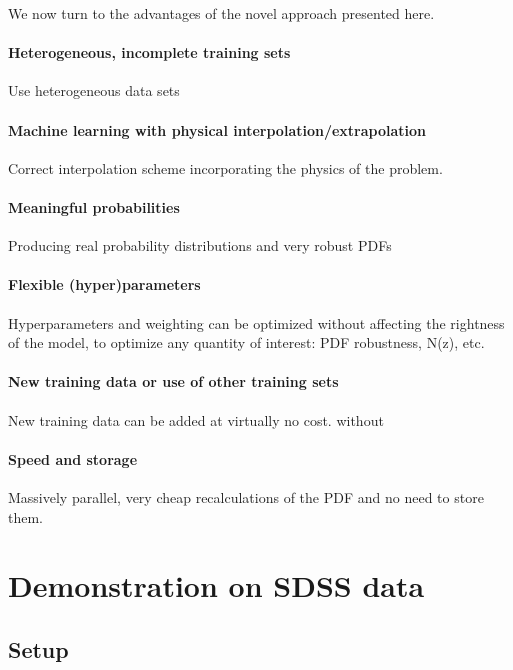\documentclass[aps,prd,showpacs,superscriptaddress,groupedaddress]{revtex4}  %
\begin{document}
\bigskip
We now turn to the advantages of the novel approach presented here.

\paragraph{Heterogeneous, incomplete training sets} 
Use heterogeneous data sets

\paragraph{Machine learning with physical interpolation/extrapolation} 
Correct interpolation scheme incorporating the physics of the problem. 

\paragraph{Meaningful probabilities} 
Producing real probability distributions and very robust PDFs

\paragraph{Flexible (hyper)parameters}
 Hyperparameters and weighting can be optimized without affecting the rightness of the model, to optimize any quantity of interest: PDF robustness, N(z), etc.

\paragraph{New training data or use of other training sets}
 New training data can be added at virtually no cost. without 

\paragraph{Speed and storage}
 Massively parallel, very cheap recalculations of the PDF and no need to store them.





\section{Demonstration on SDSS data}\label{sec:data}

\subsection{Setup}
\end{document}
